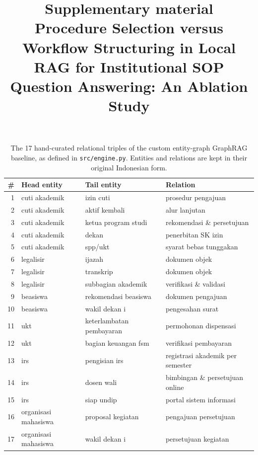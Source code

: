 \documentclass[10pt]{article}
\title{Supplementary material\\[4pt]\large Procedure Selection versus Workflow Structuring in Local RAG for Institutional SOP Question Answering: An Ablation Study}
\date{}
\newcommand{\nVerified}{40}
\begin{document}
\maketitle
\begin{table}[!htbp]
\centering
\caption{Complete evaluation results across all 10 systems on \nVerified{} verified benchmark questions, reporting mean [95\% bootstrap confidence intervals].}
\label{tab:results-full}
\scriptsize
\setlength{\tabcolsep}{2pt}
\resizebox{\textwidth}{!}{%
}
\end{table}

\begin{table}[!htbp]
\centering
\caption{The 17 hand-curated relational triples of the custom entity-graph GraphRAG baseline, as defined in \texttt{src/engine.py}. Entities and relations are kept in their original Indonesian form.}
\label{tab:triples}
\scriptsize
\setlength{\tabcolsep}{4pt}
\begin{tabular}{rlll}
\toprule
\# & Head entity & Tail entity & Relation \\
\midrule
1 & cuti akademik & izin cuti & prosedur pengajuan \\
2 & cuti akademik & aktif kembali & alur lanjutan \\
3 & cuti akademik & ketua program studi & rekomendasi \& persetujuan \\
4 & cuti akademik & dekan & penerbitan SK izin \\
5 & cuti akademik & spp/ukt & syarat bebas tunggakan \\
6 & legalisir & ijazah & dokumen objek \\
7 & legalisir & transkrip & dokumen objek \\
8 & legalisir & subbagian akademik & verifikasi \& validasi \\
9 & beasiswa & rekomendasi beasiswa & dokumen pengajuan \\
10 & beasiswa & wakil dekan i & pengesahan surat \\
11 & ukt & keterlambatan pembayaran & permohonan dispensasi \\
12 & ukt & bagian keuangan fsm & verifikasi pembayaran \\
13 & irs & pengisian irs & registrasi akademik per semester \\
14 & irs & dosen wali & bimbingan \& persetujuan online \\
15 & irs & siap undip & portal sistem informasi \\
16 & organisasi mahasiswa & proposal kegiatan & pengajuan persetujuan \\
17 & organisasi mahasiswa & wakil dekan i & persetujuan kegiatan \\
\bottomrule
\end{tabular}
\end{table}
\end{document}
